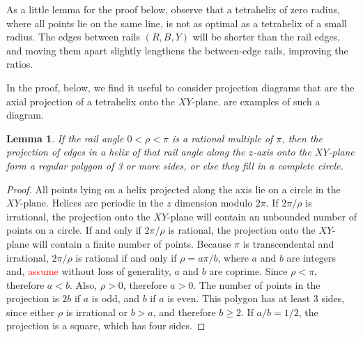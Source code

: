\documentclass[twocolumn,10pt]{asme2ej}
\newtheorem{lemma}{Lemma}
\newcommand{\highlighttext}[1] {\textcolor{red}{#1}}
\begin{document}
As a little lemma for the proof below, observe that a tetrahelix of zero radius, where
all points lie on the same line,
is not as optimal as a tetrahelix of a small radius. The edges between rails $(R,B,Y)$ will be
shorter than the rail edges, and moving them apart slightly lengthens the between-edge
rails, improving the ratios.

In the proof, below, we find it useful to consider projection diagrams that are the axial projection
of a tetrahelix onto the $XY$-plane.  are examples
of such a diagram.
\begin{lemma}
  If the rail angle $0 < \rho < \pi$ is a rational multiple of $\pi$, then the projection of
  edges in a helix of that rail angle  along the $z$-axis onto the $XY$-plane form a
  regular polygon of 3 or more sides, or else they fill in a complete circle.
  \label{lemma:ngon}
\end{lemma}
\begin{proof}
  All points lying on a helix projected along the axis lie on a circle in the $XY$-plane.
  Helices are periodic in the $z$ dimension modulo $2\pi$.
  If $2\pi/\rho$ is irrational, the projection onto the $XY$-plane will contain
  an unbounded number of points on a circle.
  If and only if $2\pi/\rho$ is rational, the projection onto
  the $XY$-plane will contain a finite number of points.
  Because $\pi$ is transcendental and irrational,
  $2\pi/\rho$ is rational if and only if $\rho = a\pi/b$, where $a$ and $b$ are integers
  and, \highlighttext{assume} without loss of generality, $a$ and $b$ are coprime.
  Since $\rho < \pi$, therefore $a < b$. Also, $\rho > 0$, therefore $a > 0$.
  The number of points in the projection is $2b$ if $a$ is odd, and $b$ if $a$ is even.
  This polygon has at least 3 sides, since either $\rho$ is irrational or $b > a$, and therefore
  $b \geq 2$. If $a/b = 1/2$, the projection is a square, which has four sides. 
\end{proof}
\end{document}
